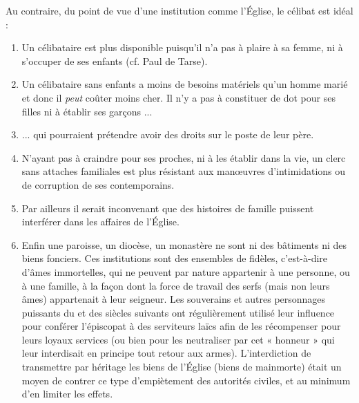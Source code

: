  Au contraire, du point de vue d'une institution comme l'Église, le célibat est idéal :
\begin{enumerate}
\item Un célibataire est plus disponible puisqu'il n'a pas à plaire à sa femme, ni à s'occuper de ses enfants (cf. Paul de Tarse).
\item Un célibataire sans enfants a moins de besoins matériels qu'un homme marié et donc il \emph{peut} coûter moins cher. Il n'y a pas à constituer de dot pour ses filles ni à établir ses garçons ...
\item ... qui pourraient prétendre avoir des droits sur le poste de leur père.
\item N'ayant pas à craindre pour ses proches, ni à les établir dans la vie, un clerc sans attaches familiales est plus résistant aux manœuvres d'intimidations ou de corruption de ses contemporains.
\item Par ailleurs il serait inconvenant que des histoires de famille puissent interférer dans les affaires de l'Église.
\item Enfin une paroisse, un diocèse, un monastère ne sont ni des bâtiments ni des biens fonciers. Ces institutions sont des ensembles de fidèles, c'est-à-dire d'âmes immortelles, qui ne peuvent par nature appartenir à une personne, ou à une famille, à la façon dont la force de travail des serfs (mais non leurs âmes) appartenait à leur seigneur. Les souverains et autres personnages puissants du  et des siècles suivants ont régulièrement utilisé leur influence pour conférer l'épiscopat à des serviteurs laïcs afin de les récompenser pour leurs loyaux services (ou bien pour les neutraliser par cet « honneur » qui leur interdisait en principe tout retour aux armes). L'interdiction de transmettre par héritage les biens de l'Église (biens de mainmorte) était un moyen de contrer ce type d'empiètement des autorités civiles, et au minimum d'en limiter les effets.
\end{enumerate}

